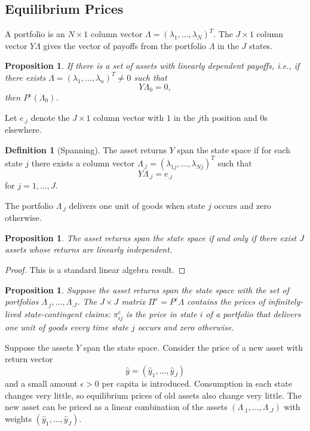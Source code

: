 \documentclass{tufte-handout}
\newtheorem{prop}[thm]{Proposition}
\theoremstyle{definition}
\newtheorem{defn}[thm]{Definition}
\begin{document}
\subsection{Equilibrium Prices}
A portfolio is an $N\times 1$ column vector $\Lambda= \left( \lambda_1,\ldots,\lambda_N \right)^{T}$. 
The $J\times 1$ column vector $Y\Lambda$ gives the vector of payoffs from the portfolio $\Lambda$ in the $J$ states.

\begin{prop}
	If there is a set of assets with linearly dependent payoffs, i.e., if there exists $\Lambda = (\lambda_1,\ldots,\lambda_n)^{T} \ne 0$ such that\[
		Y\Lambda_0 = 0
	,\] then $P^e (\Lambda_0)$.
\end{prop}

Let $e_{.j}$ denote the $J\times 1$ column vector with $1$ in the $j$th position and $0$s elsewhere.

\begin{defn}[Spanning]
	The asset returns $Y$ span the state space if for each state $j$ there exists a column vector $\Lambda_{.j} = \left( \lambda_{1j},\ldots,\lambda_{Nj} \right)^{T}$ such that \[
		Y \Lambda_{.j} = e_{.j}
	\] for $j = 1,\ldots,J$.
\end{defn}
The portfolio $\Lambda_{.j}$ delivers one unit of goods when state $j$ occurs and zero otherwise.

\begin{prop}
	The asset returns span the state space if and only if there exist $J$ assets whose returns are linearly independent.
\end{prop}
\begin{proof}
	This is a standard linear algebra result.
\end{proof}

\begin{prop}
	Suppose the asset returns span the state space with the set of portfolios $\Lambda_{_.j}, \ldots,\Lambda_{.J}$. The $J\times J$ matrix $\Pi^{e} = P^e \Lambda$ contains the prices of infinitely-lived state-contingent claims: $\pi_{ij}^{e}$ is the price in state $i$ of a portfolio that delivers one unit of goods every time state $j$ occurs and zero otherwise.
\end{prop}



 Suppose the assets $Y$ span the state space. Consider the price of a new asset with return vector \[
	\hat{y} = \left( \hat{y}_1,\ldots,\hat{y}_J \right)
\] and a small amount $\epsilon > 0$ per capita is introduced. Consumption in each state changes very little, so equilibrium prices of old assets also change very little. The new asset can be priced as a linear combination of the assets $\left( \Lambda_{.1},\ldots,\Lambda_{.J} \right)$ with weights $\left( \hat{y}_1,\ldots,\hat{y}_J \right)$. 
\end{document}
